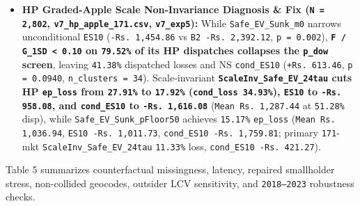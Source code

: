 \documentclass[11pt,a4paper]{article}
\begin{document}
\begin{itemize}
  \item \textbf{HP Graded-Apple Scale Non-Invariance Diagnosis \& Fix (\texttt{N = 2,802}, \texttt{v7\_hp\_apple\_171.csv}, \texttt{v7\_exp5}):} While \texttt{Safe\_EV\_Sunk\_m0} narrows unconditional \texttt{ES10} (\texttt{-Rs.\,1,454.86} vs \texttt{B2 -Rs.\,2,392.12}, \texttt{p = 0.002}), \textbf{\texttt{F / G\_1SD < 0.10} on \texttt{79.52\%} of its HP dispatches collapses the \texttt{p\_dow} screen}, leaving \texttt{41.38\%} dispatched losses and NS \texttt{cond\_ES10} (\texttt{+Rs.\,613.46}, \texttt{p = 0.0940}, \texttt{n\_clusters = 34}). Scale-invariant \textbf{\texttt{ScaleInv\_Safe\_EV\_24tau} cuts HP \texttt{ep\_loss} from \texttt{27.91\%} to \texttt{17.92\%} (\texttt{cond\_loss 34.93\%}), \texttt{ES10} to \texttt{-Rs.\,958.08}, and \texttt{cond\_ES10} to \texttt{-Rs.\,1,616.08}} (\texttt{Mean Rs.\,1,287.44} at \texttt{51.28\%} disp), while \texttt{Safe\_EV\_Sunk\_pFloor50} achieves \texttt{15.17\%} \texttt{ep\_loss} (\texttt{Mean Rs.\,1,036.94}, \texttt{ES10 -Rs.\,1,011.73}, \texttt{cond\_ES10 -Rs.\,1,759.81}; primary \texttt{171}-mkt \texttt{ScaleInv\_Safe\_EV\_24tau} \texttt{11.33\%} loss, \texttt{cond\_ES10 -Rs.\,421.27}).
\end{itemize}

Table 5 summarizes counterfactual missingness, latency, repaired smallholder stress, non-collided geocodes, outsider LCV sensitivity, and \texttt{2018--2023} robustness checks.
\end{document}
